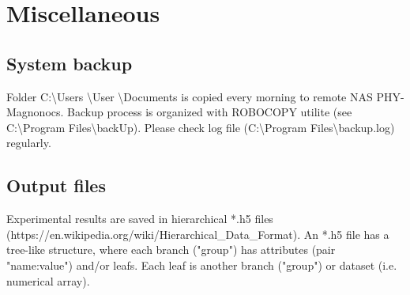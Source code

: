 \documentclass[14pt,a4paper] {article}
\begin{document}



\section{Miscellaneous}

\subsection{System backup}
 Folder C:\textbackslash Users \textbackslash User \textbackslash Documents is copied every morning to remote NAS PHY-Magnonocs.  
 Backup process is organized with ROBOCOPY utilite (see C:\textbackslash Program Files\textbackslash backUp). Please check log file (C:\textbackslash Program Files\textbackslash backup.log) regularly.

\subsection{Output files}

Experimental results are saved in hierarchical *.h5 files (https://en.wikipedia.org/wiki/Hierarchical_Data_Format). An *.h5 file has a tree-like structure, where each branch ("group") has attributes (pair "name:value") and/or leafs. Each leaf is another branch ("group") or dataset (i.e. numerical array).
\end{document}
